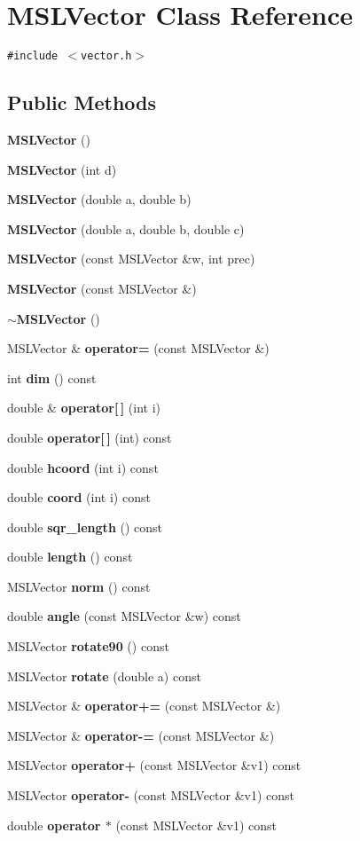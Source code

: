 \section{MSLVector  Class Reference}
\label{classMSLVector}
{\tt \#include $<$vector.h$>$}

\subsection*{Public Methods}
\begin{CompactItemize}
\item 
{\bf MSLVector} ()
\item 
{\bf MSLVector} (int d)
\item 
{\bf MSLVector} (double a, double b)
\item 
{\bf MSLVector} (double a, double b, double c)
\item 
{\bf MSLVector} (const MSLVector \&w, int prec)
\item 
{\bf MSLVector} (const MSLVector \&)
\item 
{\bf $\sim$MSLVector} ()
\item 
MSLVector \& {\bf operator=} (const MSLVector \&)
\item 
int {\bf dim} () const
\item 
double \& {\bf operator[$\,$]} (int i)
\item 
double {\bf operator[$\,$]} (int) const
\item 
double {\bf hcoord} (int i) const
\item 
double {\bf coord} (int i) const
\item 
double {\bf sqr\_\-length} () const
\item 
double {\bf length} () const
\item 
MSLVector {\bf norm} () const
\item 
double {\bf angle} (const MSLVector \&w) const
\item 
MSLVector {\bf rotate90} () const
\item 
MSLVector {\bf rotate} (double a) const
\item 
MSLVector \& {\bf operator+=} (const MSLVector \&)
\item 
MSLVector \& {\bf operator-=} (const MSLVector \&)
\item 
MSLVector {\bf operator+} (const MSLVector \&v1) const
\item 
MSLVector {\bf operator-} (const MSLVector \&v1) const
\item 
double {\bf operator $\ast$} (const MSLVector \&v1) const

\end{CompactItemize}
